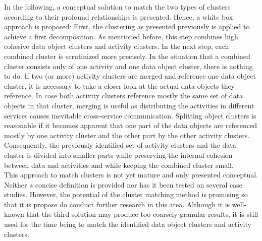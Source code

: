 In the following, a conceptual solution to match the two types of clusters according to their profound relationships is presented. Hence, a white box approach is proposed: First, the clustering as presented previously is applied to achieve a first decomposition. As mentioned before, this step combines high cohesive data object clusters and activity clusters. In the next step, each combined cluster is scrutinized more precisely. In the situation that a combined cluster consists only of one activity and one data object cluster, there is nothing to do. If two (or more) activity clusters are merged and reference one data object cluster, it is necessary to take a closer look at the actual data objects they reference. In case both activity clusters reference mostly the same set of data objects in that cluster, merging is useful as distributing the activities in different services causes inevitable cross-service communication. Splitting object clusters is reasonable if it becomes apparent that one part of the data objects are referenced mostly by one activity cluster and the other part by the other activity clusters. Consequently, the previously identified set of activity clusters and the data cluster is divided into smaller parts while preserving the internal cohesion between data and activities and while keeping the combined cluster small. \\
This approach to match clusters is not yet mature and only presented conceptual. Neither a concise definition is provided nor has it been tested on several case studies. However, the potential of the cluster matching method is promising so that it is propose do conduct further research in this area. 
Although it is well-known that the third solution may produce too coarsely granular results, it is still used for the time being to match the identified data object clusters and activity clusters. \\





